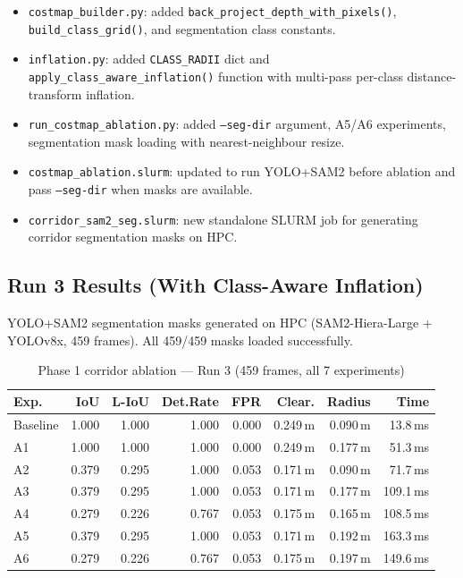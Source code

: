 \documentclass[11pt,a4paper]{article}
\begin{document}
\begin{itemize}[nosep]
  \item \texttt{costmap\_builder.py}: added \texttt{back\_project\_depth\_with\_pixels()},
    \texttt{build\_class\_grid()}, and segmentation class constants.
  \item \texttt{inflation.py}: added \texttt{CLASS\_RADII} dict and
    \texttt{apply\_class\_aware\_inflation()} function with multi-pass
    per-class distance-transform inflation.
  \item \texttt{run\_costmap\_ablation.py}: added \texttt{--seg-dir} argument,
    A5/A6 experiments, segmentation mask loading with nearest-neighbour resize.
  \item \texttt{costmap\_ablation.slurm}: updated to run YOLO+SAM2 before
    ablation and pass \texttt{--seg-dir} when masks are available.
  \item \texttt{corridor\_sam2\_seg.slurm}: new standalone SLURM job for
    generating corridor segmentation masks on HPC.
\end{itemize}

\subsection{Run 3 Results (With Class-Aware Inflation)}

YOLO+SAM2 segmentation masks generated on HPC (SAM2-Hiera-Large +
YOLOv8x, 459 frames). All 459/459 masks loaded successfully.

\begin{table}[h]
\centering
\caption{Phase 1 corridor ablation --- Run 3 (459 frames, all 7 experiments)}
\label{tab:phase1-run3}
\begin{tabular}{lrrrrrrr}
\toprule
\textbf{Exp.} & \textbf{IoU} & \textbf{L-IoU} & \textbf{Det.Rate} & \textbf{FPR} & \textbf{Clear.} & \textbf{Radius} & \textbf{Time} \\
\midrule
Baseline & 1.000 & 1.000 & 1.000 & 0.000 & 0.249\,m & 0.090\,m & 13.8\,ms \\
A1       & 1.000 & 1.000 & 1.000 & 0.000 & 0.249\,m & 0.177\,m & 51.3\,ms \\
A2       & 0.379 & 0.295 & 1.000 & 0.053 & 0.171\,m & 0.090\,m & 71.7\,ms \\
A3       & 0.379 & 0.295 & 1.000 & 0.053 & 0.171\,m & 0.177\,m & 109.1\,ms \\
A4       & 0.279 & 0.226 & 0.767 & 0.053 & 0.175\,m & 0.165\,m & 108.5\,ms \\
A5       & 0.379 & 0.295 & 1.000 & 0.053 & 0.171\,m & 0.192\,m & 163.3\,ms \\
A6       & 0.279 & 0.226 & 0.767 & 0.053 & 0.175\,m & 0.197\,m & 149.6\,ms \\
\bottomrule
\end{tabular}
\end{table}
\end{document}

